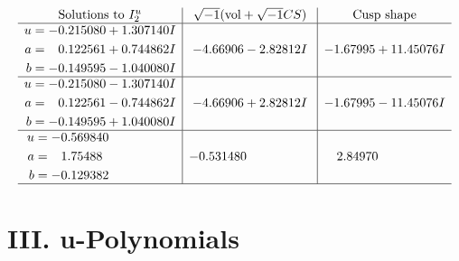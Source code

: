 \documentclass[1p]{elsarticle_modified}
\theoremstyle{definition}
\newcommand{\I}{\sqrt{-1}}
\begin{document}
$$\begin{array}{c|c|c}  
\text{Solutions to }I^u_{2}& \I (\text{vol} + \sqrt{-1}CS) & \text{Cusp shape}\\
 \hline 
\begin{aligned}
u &= -0.215080 + 1.307140 I \\
a &= \phantom{-}0.122561 + 0.744862 I \\
b &= -0.149595 - 1.040080 I\end{aligned}
 & -4.66906 - 2.82812 I & -1.67995 + 11.45076 I \\ \hline\begin{aligned}
u &= -0.215080 - 1.307140 I \\
a &= \phantom{-}0.122561 - 0.744862 I \\
b &= -0.149595 + 1.040080 I\end{aligned}
 & -4.66906 + 2.82812 I & -1.67995 - 11.45076 I \\ \hline\begin{aligned}
u &= -0.569840\phantom{ +0.000000I} \\
a &= \phantom{-}1.75488\phantom{ +0.000000I} \\
b &= -0.129382\phantom{ +0.000000I}\end{aligned}
 & -0.531480\phantom{ +0.000000I} & \phantom{-}2.84970\phantom{ +0.000000I}\\
 \hline 
 \end{array}$$\newpage
\newpage\renewcommand{\arraystretch}{1}
\centering \section*{ III. u-Polynomials}
\end{document}

